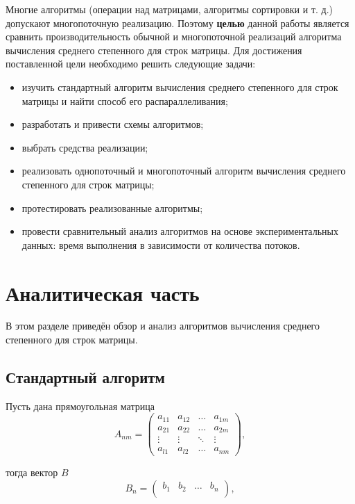 \documentclass[12pt]{report}
\begin{document}
Многие алгоритмы (операции над матрицами, алгоритмы сортировки и т. д.) допускают многопоточную реализацию. Поэтому \textbf{целью} данной работы является сравнить производительность обычной и многопоточной реализаций алгоритма вычисления среднего степенного для строк матрицы.
Для достижения поставленной цели необходимо решить следующие задачи:
\begin{itemize}
	\item изучить стандартный алгоритм вычисления среднего степенного для строк матрицы и найти способ его распараллеливания;
	\item разработать и привести схемы алгоритмов;
	\item выбрать средства реализации;
	\item реализовать однопоточный и многопоточный алгоритм вычисления среднего степенного для строк матрицы;
	\item протестировать реализованные алгоритмы;
	\item провести сравнительный анализ алгоритмов на основе экспериментальных данных: время выполнения в зависимости от количества потоков.
\end{itemize}


\chapter{Аналитическая часть}

В этом разделе приведён обзор и анализ алгоритмов вычисления среднего степенного для строк матрицы.

\section{Стандартный алгоритм}

Пусть дана прямоугольная матрица
\begin{equation}
	A_{nm} = \begin{pmatrix}
		a_{11} & a_{12} & \ldots & a_{1m}\\
		a_{21} & a_{22} & \ldots & a_{2m}\\
		\vdots & \vdots & \ddots & \vdots\\
		a_{l1} & a_{l2} & \ldots & a_{nm}
	\end{pmatrix},
\end{equation}

тогда вектор $B$
\begin{equation}
	B_{n} = \begin{pmatrix}
		b_{1} & b_{2} & \ldots & b_{n}\\
	\end{pmatrix},
\end{equation}
\end{document}
